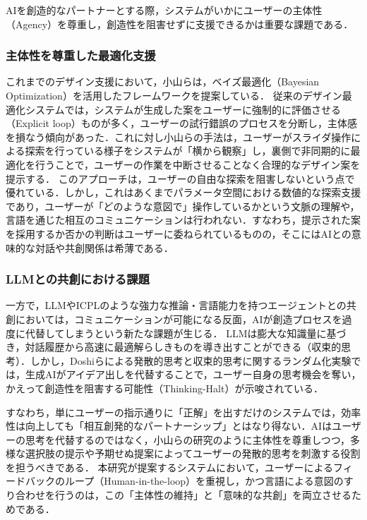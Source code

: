 AIを創造的なパートナーとする際，システムがいかにユーザーの主体性（Agency）を尊重し，創造性を阻害せずに支援できるかは重要な課題である．

\subsubsection{主体性を尊重した最適化支援}
これまでのデザイン支援において，小山らは，ベイズ最適化（Bayesian Optimization）を活用したフレームワーク\cite{BOデザイン提案}を提案している．
従来のデザイン最適化システムでは，システムが生成した案をユーザーに強制的に評価させる（Explicit loop）ものが多く，ユーザーの試行錯誤のプロセスを分断し，主体感を損なう傾向があった．これに対し小山らの手法は，ユーザーがスライダ操作による探索を行っている様子をシステムが「横から観察」し，裏側で非同期的に最適化を行うことで，ユーザーの作業を中断させることなく合理的なデザイン案を提示する．
このアプローチは，ユーザーの自由な探索を阻害しないという点で優れている．しかし，これはあくまでパラメータ空間における数値的な探索支援であり，ユーザーが「どのような意図で」操作しているかという文脈の理解や，言語を通じた相互のコミュニケーションは行われない．すなわち，提示された案を採用するか否かの判断はユーザーに委ねられているものの，そこにはAIとの意味的な対話や共創関係は希薄である．

\subsubsection{LLMとの共創における課題}
一方で，LLMやICPLのような強力な推論・言語能力を持つエージェントとの共創においては，コミュニケーションが可能になる反面，AIが創造プロセスを過度に代替してしまうという新たな課題が生じる．
LLMは膨大な知識量に基づき，対話履歴から高速に最適解らしきものを導き出すことができる（収束的思考）．しかし，Doshiら\cite{人とLLMの共創}による発散的思考と収束的思考に関するランダム化実験では，生成AIがアイデア出しを代替することで，ユーザー自身の思考機会を奪い，かえって創造性を阻害する可能性（Thinking-Halt）が示唆されている．

すなわち，単にユーザーの指示通りに「正解」を出すだけのシステムでは，効率性は向上しても「相互創発的なパートナーシップ」とはなり得ない．AIはユーザーの思考を代替するのではなく，小山らの研究のように主体性を尊重しつつ，多様な選択肢の提示や予期せぬ提案によってユーザーの発散的思考を刺激する役割を担うべきである．
本研究が提案するシステムにおいて，ユーザーによるフィードバックのループ（Human-in-the-loop）を重視し，かつ言語による意図のすり合わせを行うのは，この「主体性の維持」と「意味的な共創」を両立させるためである．


